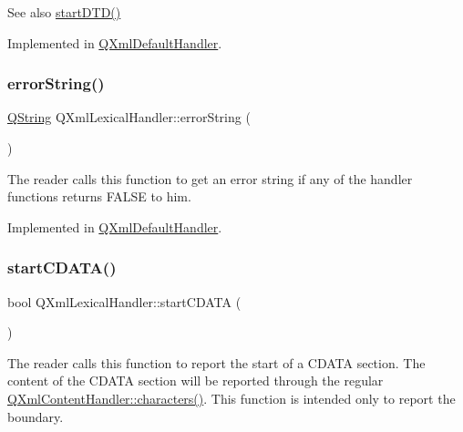 \begin{DoxySeeAlso}{See also}
\mbox{\hyperlink{class_q_xml_lexical_handler_a1bdcb91e384a32b218d04304e1116808}{start\+D\+T\+D()}} 
\end{DoxySeeAlso}


Implemented in \mbox{\hyperlink{class_q_xml_default_handler_abc0de9f5db640394347d6c8c4c416c84}{Q\+Xml\+Default\+Handler}}.

\mbox{\label{class_q_xml_lexical_handler_a2b1fdd6448b6a07b2af197fd3aca60d3}} 
\subsubsection{\texorpdfstring{errorString()}{errorString()}}
{\footnotesize\ttfamily \mbox{\hyperlink{class_q_string}{Q\+String}} Q\+Xml\+Lexical\+Handler\+::error\+String (\begin{DoxyParamCaption}{ }\end{DoxyParamCaption})\hspace{0.3cm}{\ttfamily [pure virtual]}}

The reader calls this function to get an error string if any of the handler functions returns F\+A\+L\+SE to him. 

Implemented in \mbox{\hyperlink{class_q_xml_default_handler_afcbe5fdce86cea4b7863e752c2413c45}{Q\+Xml\+Default\+Handler}}.

\mbox{\label{class_q_xml_lexical_handler_a64c691b5eeae5af0230d5fad46be2df2}} 
\subsubsection{\texorpdfstring{startCDATA()}{startCDATA()}}
{\footnotesize\ttfamily bool Q\+Xml\+Lexical\+Handler\+::start\+C\+D\+A\+TA (\begin{DoxyParamCaption}{ }\end{DoxyParamCaption})\hspace{0.3cm}{\ttfamily [pure virtual]}}

The reader calls this function to report the start of a C\+D\+A\+TA section. The content of the C\+D\+A\+TA section will be reported through the regular \mbox{\hyperlink{class_q_xml_content_handler_a3be0d440b48836560c8805e15d596eb1}{Q\+Xml\+Content\+Handler\+::characters()}}. This function is intended only to report the boundary.

